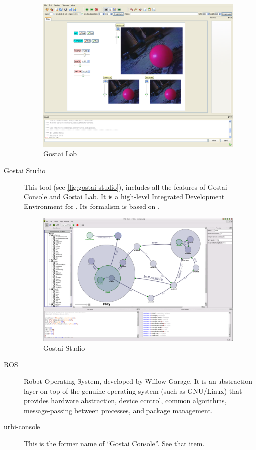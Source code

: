 \begin{description}
  \begin{figure}[htp]
    \centering
    \includegraphics[width=.8\linewidth]{img/gostai-lab}
    \caption{Gostai Lab}
    \label{fig:gostai-lab}
  \end{figure}

\item[Gostai Studio] This tool (see \autoref{fig:gostai-studio}),
  includes all the features of Gostai Console and Gostai Lab.  It is a
  high-level Integrated Development Environment for \urbi.  Its
  formalism is based on .

  \begin{figure}[htp]
    \centering
    \includegraphics[width=.8\linewidth]{img/gostai-studio}
    \caption{Gostai Studio}
    \label{fig:gostai-studio}
  \end{figure}

\item[ROS] Robot Operating System, developed by Willow Garage.  It is an
  abstraction layer on top of the genuine operating system (such as
  GNU/Linux) that provides hardware abstraction, device control, common
  algorithms, message-passing between processes, and package management.

\item[urbi-console] This is the former name of ``Gostai Console''.
  See that item.
\end{description}

